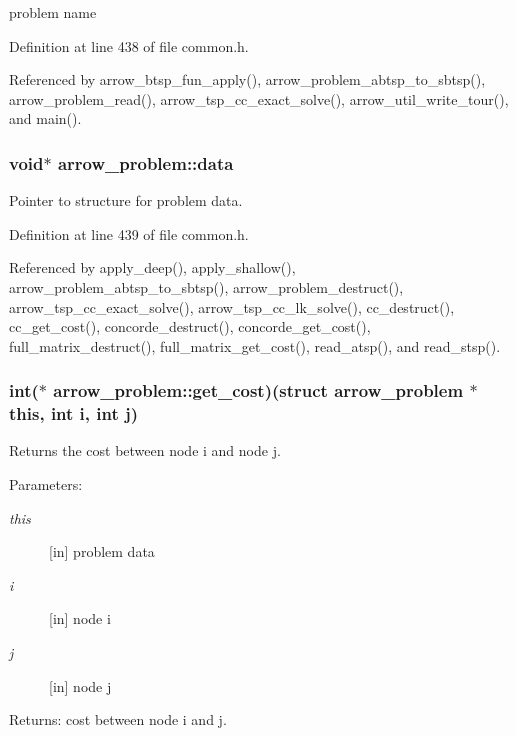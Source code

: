 problem name 

Definition at line 438 of file common.h.

Referenced by arrow\_\-btsp\_\-fun\_\-apply(), arrow\_\-problem\_\-abtsp\_\-to\_\-sbtsp(), arrow\_\-problem\_\-read(), arrow\_\-tsp\_\-cc\_\-exact\_\-solve(), arrow\_\-util\_\-write\_\-tour(), and main().\hypertarget{structarrow__problem_6dbeb0f93e110adf45096c7457cd588d}{
\subsubsection{\setlength{\rightskip}{0pt plus 5cm}void$\ast$ {\bf arrow\_\-problem::data}}}
\label{structarrow__problem_6dbeb0f93e110adf45096c7457cd588d}


Pointer to structure for problem data. 

Definition at line 439 of file common.h.

Referenced by apply\_\-deep(), apply\_\-shallow(), arrow\_\-problem\_\-abtsp\_\-to\_\-sbtsp(), arrow\_\-problem\_\-destruct(), arrow\_\-tsp\_\-cc\_\-exact\_\-solve(), arrow\_\-tsp\_\-cc\_\-lk\_\-solve(), cc\_\-destruct(), cc\_\-get\_\-cost(), concorde\_\-destruct(), concorde\_\-get\_\-cost(), full\_\-matrix\_\-destruct(), full\_\-matrix\_\-get\_\-cost(), read\_\-atsp(), and read\_\-stsp().\hypertarget{structarrow__problem_4f1f4c9ef90f240b248e8f39360da769}{
\subsubsection{\setlength{\rightskip}{0pt plus 5cm}int($\ast$ {\bf arrow\_\-problem::get\_\-cost})(struct {\bf arrow\_\-problem} $\ast$this, int i, int j)}}
\label{structarrow__problem_4f1f4c9ef90f240b248e8f39360da769}


Returns the cost between node i and node j. 

\begin{Desc}
\item[Parameters:]
\begin{description}
\item[{\em this}]\mbox{[}in\mbox{]} problem data \item[{\em i}]\mbox{[}in\mbox{]} node i \item[{\em j}]\mbox{[}in\mbox{]} node j \end{description}
\end{Desc}
\begin{Desc}
\item[Returns:]cost between node i and j. \end{Desc}


